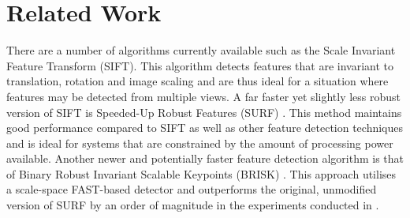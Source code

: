 \documentclass{report}
\begin{document}
%
%
%
%
%


\section{Related Work}
\label{sec:relatedWork}

There are a number of algorithms currently available such as the Scale Invariant Feature Transform (SIFT)\cite{Lowe1999}. This algorithm detects features that are invariant to translation, rotation and image scaling and are thus ideal for a situation where features may be detected from multiple views. A far faster yet slightly less robust version of SIFT is Speeded-Up Robust Features (SURF) \cite{Bay2008}. This method maintains good performance compared to SIFT as well as other feature detection techniques \cite{Juan2009} and is ideal for systems that are constrained by the amount of processing power available. Another newer and potentially faster feature detection algorithm is that of Binary Robust Invariant Scalable Keypoints (BRISK) \cite{Leutenegger}. This approach utilises a scale-space FAST-based detector and outperforms the original, unmodified version of SURF by an order of magnitude in the experiments conducted in \cite{Leutenegger}.
\end{document}
